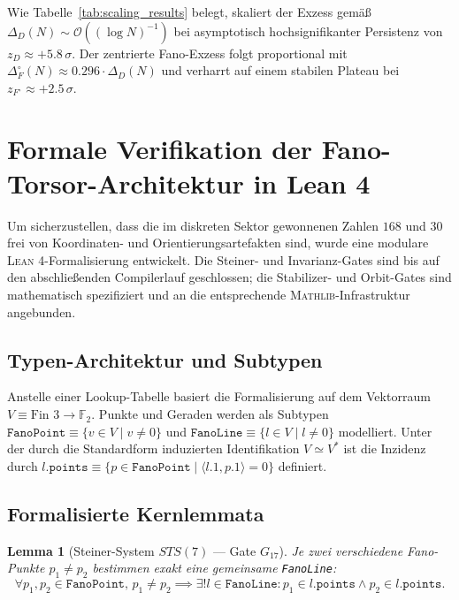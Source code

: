 \documentclass[11pt,a4paper]{article}
\newtheorem{lemma}[theorem]{Lemma}
\theoremstyle{remark}
\begin{document}
	Wie Tabelle~\ref{tab:scaling_results} belegt, skaliert der Exzess gemäß $\Delta_D(N) \sim \mathcal{O}((\log N)^{-1})$ bei asymptotisch hochsignifikanter Persistenz von $z_D \approx +5.8\,\sigma$. Der zentrierte Fano-Exzess folgt proportional mit $\Delta_F^\circ(N) \approx 0.296 \cdot \Delta_D(N)$ und verharrt auf einem stabilen Plateau bei $z_{F^\circ} \approx +2.5\,\sigma$.
	
	\section{Formale Verifikation der Fano-Torsor-Architektur in Lean 4}
	\label{sec:lean4_fano_verification}
	
	Um sicherzustellen, dass die im diskreten Sektor gewonnenen Zahlen $168$ und $30$ frei von Koordinaten- und Orientierungsartefakten sind, wurde eine modulare \textsc{Lean 4}-Formalisierung entwickelt. Die Steiner- und Invarianz-Gates sind bis auf den abschließenden Compilerlauf geschlossen; die Stabilizer- und Orbit-Gates sind mathematisch spezifiziert und an die entsprechende \textsc{Mathlib}-Infrastruktur angebunden.
	
	\subsection{Typen-Architektur und Subtypen}
	Anstelle einer Lookup-Tabelle basiert die Formalisierung auf dem Vektorraum $V \equiv \text{Fin } 3 \to \mathbb{F}_2$. Punkte und Geraden werden als Subtypen $\texttt{FanoPoint} \equiv \{v \in V \mid v \neq 0\}$ und $\texttt{FanoLine} \equiv \{l \in V \mid l \neq 0\}$ modelliert. Unter der durch die Standardform induzierten Identifikation $V \simeq V^*$ ist die Inzidenz durch $l.\texttt{points} \equiv \{p \in \texttt{FanoPoint} \mid \langle l.1, p.1 \rangle = 0\}$ definiert.
	
	\subsection{Formalisierte Kernlemmata}
	
	\begin{lemma}[Steiner-System $STS(7)$ --- Gate $G_{17}$]
		Je zwei verschiedene Fano-Punkte $p_1 \neq p_2$ bestimmen exakt eine gemeinsame \texttt{FanoLine}:
		\begin{equation}
			\forall p_1, p_2 \in \texttt{FanoPoint}, \, p_1 \neq p_2 \implies \exists! l \in \texttt{FanoLine}: p_1 \in l.\texttt{points} \land p_2 \in l.\texttt{points}.
		\end{equation}
	\end{lemma}
	
\end{document}
